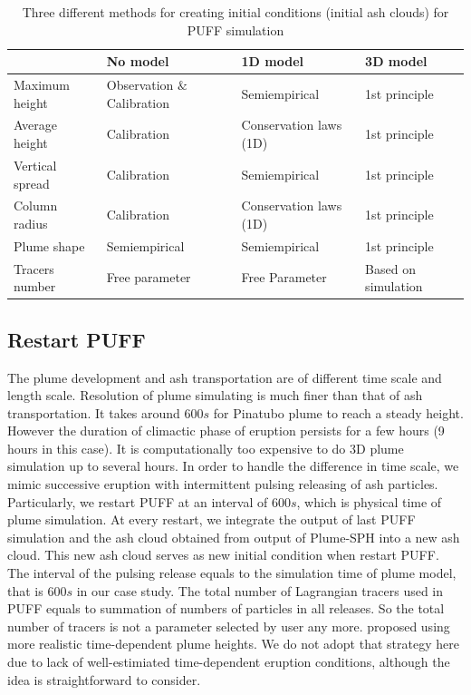 \begin{table}
\centering
      \caption{Three different methods for creating initial conditions (initial ash clouds) for PUFF simulation}		
	  \begin{tabular}{p{33mm}p{32mm}p{32mm}p{32mm}}
	    \hline
	    		 & No model & 1D model & 3D model \\
	    		 \hline    		 
	  Maximum height & Observation $\&$ \newline Calibration & Semiempirical &  1st principle \\
	  Average height &  Calibration & Conservation \newline laws (1D) &  1st principle  \\
	  Vertical spread &  Calibration & Semiempirical & 1st principle \\
	  Column radius & Calibration  &  Conservation \newline laws (1D) &  1st principle \\
	  Plume shape & Semiempirical & Semiempirical  & 1st principle \\
	  Tracers number & Free \newline parameter  & Free \newline Parameter & Based on \newline simulation\\ 
	    \hline
	  \end{tabular}
	  \label{tab:VATDs-source-term-determination}
\end{table}

\subsection{Restart PUFF}

The plume development and ash transportation are of different time scale and length scale. Resolution of plume simulating is much finer than that of ash transportation.
It takes around $600 s$ for Pinatubo plume to reach a steady height. However the duration of climactic phase of eruption persists for a few hours (9 hours in this case). It is computationally too expensive to do 3D plume simulation up to several hours. In order to handle the difference in time scale, we mimic successive eruption with intermittent pulsing releasing of ash particles. Particularly, we restart PUFF at an interval of $600 s$, which is physical time of plume simulation. At every restart, we integrate the output of last PUFF simulation and the ash cloud obtained from output of Plume-SPH into a new ash cloud. This new ash cloud serves as new initial condition when restart PUFF. The interval of the pulsing release equals to the simulation time of plume model, that is $600 s$ in our case study. The total number of Lagrangian tracers used in PUFF equals to summation of numbers of particles in all releases. So the total number of tracers is not a parameter selected by user any more.
\citet{fero2008simulation} proposed using more realistic time-dependent plume heights. We do not adopt that strategy here due to lack of well-estimiated time-dependent eruption conditions, although the idea is straightforward to consider.


